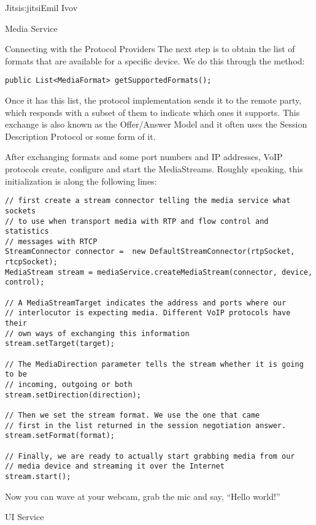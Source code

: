 \begin{aosachapter}{Jitsi}{s:jitsi}{Emil Ivov}
\begin{aosasect1}{Media Service}
\begin{aosasect2}{Connecting with the Protocol Providers}
The next step is to obtain the list of formats that are available for
a specific device. We do this through the
 method:

\begin{verbatim}
public List<MediaFormat> getSupportedFormats();
\end{verbatim}

\noindent Once it has this list, the protocol implementation sends it to the
remote party, which responds with a subset of them to indicate which
ones it supports. This exchange is also known as the Offer/Answer
Model and it often uses the Session Description Protocol or some form
of it.

After exchanging formats and some port numbers and IP addresses, VoIP
protocols create, configure and start the MediaStreams. Roughly
speaking, this initialization is along the following lines:

\begin{verbatim}
// first create a stream connector telling the media service what sockets
// to use when transport media with RTP and flow control and statistics
// messages with RTCP
StreamConnector connector =  new DefaultStreamConnector(rtpSocket, rtcpSocket);
MediaStream stream = mediaService.createMediaStream(connector, device, control);

// A MediaStreamTarget indicates the address and ports where our
// interlocutor is expecting media. Different VoIP protocols have their
// own ways of exchanging this information
stream.setTarget(target);

// The MediaDirection parameter tells the stream whether it is going to be
// incoming, outgoing or both
stream.setDirection(direction);

// Then we set the stream format. We use the one that came
// first in the list returned in the session negotiation answer.
stream.setFormat(format);

// Finally, we are ready to actually start grabbing media from our
// media device and streaming it over the Internet
stream.start();
\end{verbatim}

\noindent Now you can wave at your webcam, grab the mic and say, ``Hello
world!''

\end{aosasect2}

\end{aosasect1}

\begin{aosasect1}{UI Service}


\end{aosasect1}
\end{aosachapter}
